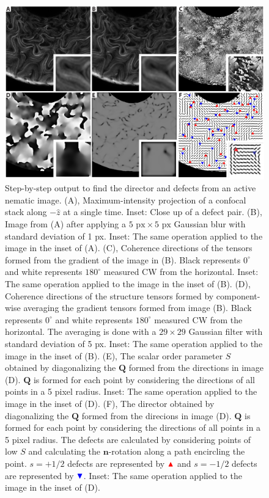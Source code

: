 \begin{figure}[H]
  \centering
  \includegraphics{figures/C3/Ch3-Figs_CEDF2.png}
  \caption{Step-by-step output to find the director and defects from an active nematic image.
(A), Maximum-intensity projection of a confocal stack along $-\hat{z}$ at a single time.
Inset: Close up of a defect pair.
(B), Image from (A) after applying a $5 \textrm{ px} \times 5 \textrm{ px}$ Gaussian blur with standard deviation of 1 px.
Inset: The same operation applied to the image in the inset of (A).
(C), Coherence directions of the tensors formed from the gradient of the image in (B).
Black represents $0^{\circ}$ and white represents $180^{\circ}$ measured CW from the horizontal.
Inset: The same operation applied to the image in the inset of (B).
(D), Coherence directions of the structure tensors formed by component-wise averaging the gradient tensors formed from image (B).
Black represents $0^{\circ}$ and white represents $180^{\circ}$ measured CW from the horizontal.
The averaging is done with a $29 \times 29$ Gaussian filter with standard deviation of 5 px.
Inset: The same operation applied to the image in the inset of (B).
(E), The scalar order parameter $S$ obtained by diagonalizing the $\mathbf{Q}$ formed from the directions in image (D).
$\mathbf{Q}$ is formed for each point by considering the directions of all points in a 5 pixel radius.
Inset: The same operation applied to the image in the inset of (D).
(F), The director obtained by diagonalizing the $\mathbf{Q}$ formed from the direcions in image (D).
$\mathbf{Q}$ is formed for each point by considering the directions of all points in a 5 pixel radius.
The defects are calculated by considering points of low $S$ and calculating the $\mathbf{n}$-rotation along a path encircling the point.
$s = +1/2$ defects are represented by ${\color{red} \blacktriangle  } $  and $s = -1/2$ defects are represented by ${ \color{blue} \blacktriangledown  } $.
Inset: The same operation applied to the image in the inset of (D).}\label{f:3-CEDF2}
\end{figure}
\newpage
